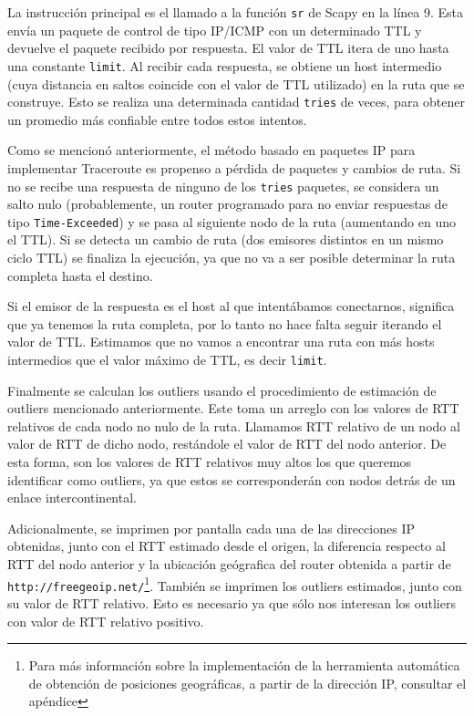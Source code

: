 La instrucción principal es el llamado a la función \texttt{sr} de Scapy en la línea 9. Esta envía un paquete de control de tipo IP/ICMP con un determinado TTL y devuelve el paquete recibido por respuesta. El valor de TTL itera de uno hasta una constante \texttt{limit}. Al recibir cada respuesta, se obtiene un host intermedio (cuya distancia en saltos coincide con el valor de TTL utilizado) en la ruta que se construye. Esto se realiza una determinada cantidad \texttt{tries} de veces, para obtener un promedio más confiable entre todos estos intentos.

Como se mencionó anteriormente, el método basado en paquetes IP para implementar Traceroute es propenso a pérdida de paquetes y cambios de ruta. Si no se recibe una respuesta de ninguno de los \texttt{tries} paquetes,
se considera un salto nulo (probablemente, un router programado para no enviar respuestas de tipo \texttt{Time-Exceeded}) y se pasa al siguiente nodo de la ruta (aumentando en uno el TTL). Si se detecta un cambio de ruta (dos emisores distintos en un mismo ciclo TTL) se finaliza la ejecución, ya que no va a ser posible determinar la ruta completa hasta el destino.

Si el emisor de la respuesta es el host al que intentábamos conectarnos, significa que ya tenemos la ruta completa, por lo tanto no hace falta seguir iterando el valor de TTL. Estimamos que no vamos a encontrar una ruta con más hosts intermedios que el valor máximo de TTL, es decir \texttt{limit}.

Finalmente se calculan los outliers usando el procedimiento de estimación de outliers mencionado anteriormente. Este toma un arreglo con los valores de RTT relativos de cada nodo no nulo de la ruta. Llamamos RTT relativo de un nodo al valor de RTT de dicho nodo, restándole el valor de RTT del nodo anterior. De esta forma, son los valores de RTT relativos muy altos los que queremos identificar como outliers, ya que estos se corresponderán con nodos detrás de un enlace intercontinental.

Adicionalmente, se imprimen por pantalla cada una de las direcciones IP obtenidas, junto con el RTT estimado desde el origen, la diferencia respecto al RTT del nodo anterior y la ubicación geógrafica del router obtenida a partir de \texttt{http://freegeoip.net/}\footnote{Para más información sobre la implementación de la herramienta automática de obtención de posiciones geográficas, a partir de la dirección IP, consultar el apéndice}. También se imprimen los outliers estimados, junto con su valor de RTT relativo. Esto es necesario ya que sólo nos interesan los outliers con valor de RTT relativo positivo.
